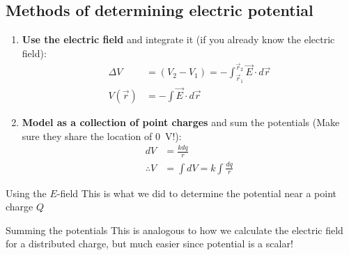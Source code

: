 \documentclass[aspectratio=169,
hyperref={colorlinks,urlcolor=blue}
]{beamer}
\begin{document}
\subsection{Methods of determining electric potential}
\label{subsec:methodsofdeterminingelectricpotential}
{
\begin{enumerate}
\item \textbf{Use the electric field} and integrate it (if you already know the electric field):
\begin{align*}
\Delta V &= (V_2-V_1) = -\int_{\vec r_1}^{\vec r_2} \vec E\cdot d\vec r\\
V(\vec r)&= -\int \vec E \cdot d\vec r
\end{align*}
\item \textbf{Model as a collection of point charges} and sum the potentials (\textcolor{myred}{Make sure they share the location of \SI{0}{V}!}):
\begin{align*}
dV&=\frac{kdq}{r}\\
\therefore V &= \int dV = k \int \frac{dq}{r}
\end{align*}
\end{enumerate}
}
{
\begin{block}{Using the $E$-field}
This is what we did to determine the potential near a point charge $Q$
\end{block}
\vspace{2cm}
\begin{block}{Summing the potentials}
This is analogous to how we calculate the electric field for a distributed charge, but much easier since potential is a scalar!
\end{block}
}

\end{document}
